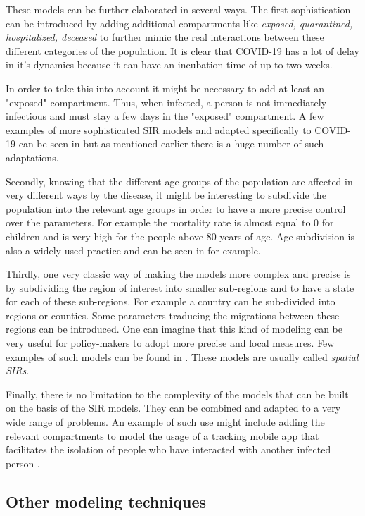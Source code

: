 \documentclass[12pt, letterpaper]{article}
\begin{document}
These models can be further elaborated in several ways. 
The first sophistication can be introduced by adding additional compartments like {\em exposed, quarantined, hospitalized, deceased} to further mimic the real interactions between these different categories of the population. 
It is clear that COVID-19 has a lot of delay in it's dynamics \cite{delay} because it can have an incubation time of up to two weeks. 

In order to take this into account it might be necessary to add at least an "exposed" compartment. 
Thus, when infected, a person is not immediately infectious and must stay a few days in the "exposed" compartment. 
A few examples of more sophisticated SIR models and adapted specifically to COVID-19 can be seen in \cite{seir, seir2} but as mentioned earlier there is a huge number of such adaptations.


Secondly, knowing that the different age groups of the population are affected in very different ways by the disease, it might be interesting to subdivide the population into the relevant age groups in order to have a more precise control over the parameters. 
For example the mortality rate is almost equal to 0 for children and is very high for the people above 80 years of age. 
Age subdivision is also a widely used practice and can be seen in \cite{age-groups, spatial2} for example.

Thirdly, one very classic way of making the models more complex and precise is by subdividing the region of interest into smaller sub-regions and to have a state for each of these sub-regions. 
For example a country can be sub-divided into regions or counties. 
Some parameters traducing the migrations between these regions can be introduced. 
One can imagine that this kind of modeling can be very useful for policy-makers to adopt more precise and local measures. 
Few examples of such models can be found in \cite{spatial, spatial2}. 
These models are usually called {\em spatial SIRs}. 

Finally, there is no limitation to the complexity of the models that can be built on the basis of the SIR models. 
They can be combined and adapted to a very wide range of problems. 
An example of such use might include adding the relevant compartments to model the usage of a tracking mobile app that facilitates the isolation of people who have interacted with another infected person \cite{mobile-app}.

\subsection{Other modeling techniques}
\end{document}
